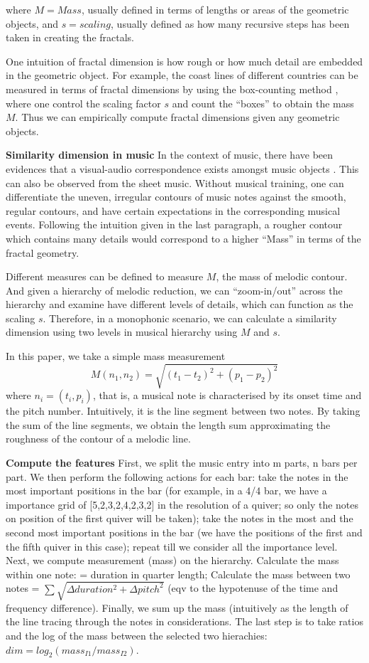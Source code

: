 where $M=Mass$, usually defined in terms of lengths or areas of the geometric objects, and $s=scaling$, usually defined as how many recursive steps has been taken in creating the fractals.

One intuition of fractal dimension is how rough or how much detail are embedded in the geometric object.
For example, the coast lines of different countries can be measured in terms of fractal dimensions by using the box-counting method \cite{sarkar1994efficient}, where one control the scaling factor $s$ and count the ``boxes'' to obtain the mass $M$.
Thus we can empirically compute fractal dimensions given any geometric objects. 

\textbf{Similarity dimension in music}
In the context of music, there have been evidences that a visual-audio correspondence exists amongst music objects \cite{thorpe2016perception}.
This can also be observed from the sheet music.
Without musical training, one can differentiate the uneven, irregular contours of music notes against the smooth, regular contours, and have certain expectations in the corresponding musical events.
Following the intuition given in the last paragraph, a rougher contour which contains many details would correspond to a higher ``Mass'' in terms of the fractal geometry.

Different measures can be defined to measure $M$, the mass of melodic contour.
And given a hierarchy of melodic reduction, we can ``zoom-in/out'' across the hierarchy and examine have different levels of details, which can function as the scaling $s$.
Therefore, in a monophonic scenario, we can calculate a similarity dimension using two levels in musical hierarchy using $M$ and $s$. 

In this paper, we take a simple mass measurement
$$M(n_1, n_2) = \sqrt{(t_1-t_2)^2 +(p_1-p_2)^2}$$
  where $n_i=(t_i, p_i)$, that is, a musical note is characterised by its onset time and the pitch number. 
Intuitively, it is the line segment between two notes.
By taking the sum of the line segments, we obtain the length sum approximating the roughness of the contour of a melodic line.

\textbf{Compute the features}
First, we split the music entry into m parts, n bars per part.
We then perform the following actions for each bar: take the notes in the most important positions in the bar (for example, in a 4/4 bar, we have a importance grid of [5,2,3,2,4,2,3,2] in the resolution of a quiver; so only the notes on position of the first quiver will be taken); take the notes in the most and the second most important positions in the bar (we have the positions of the first and the fifth quiver in this case); repeat till we consider all the importance level. Next, we compute measurement (mass) on the hierarchy. Calculate the mass within one note: = duration in quarter length; Calculate the mass between two notes =  $\sum \sqrt{\Delta duration^2 + \Delta pitch^2}$ (eqv to the hypotenuse of the time and frequency difference). Finally, we sum up the mass (intuitively as the length of the line tracing through the notes in considerations. The last step is to take ratios and the log of the mass between the selected two hierachies: $dim = log_2(mass_{I1}/mass_{I2})$.


